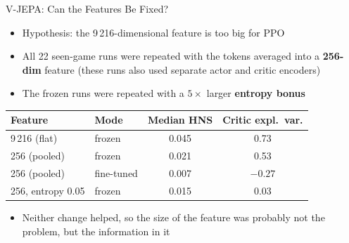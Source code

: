 \documentclass[aspectratio=43,10pt]{beamer}
\begin{document}
\begin{frame}{V-JEPA: Can the Features Be Fixed?}
  \begin{itemize}\setlength\itemsep{0.55em}
    \item Hypothesis: the 9\,216-dimensional feature is too big for PPO
    \item All 22 seen-game runs were repeated with the tokens averaged into a \textbf{256-dim}
          feature (these runs also used separate actor and critic encoders)
    \item The frozen runs were repeated with a $5\times$ larger \textbf{entropy bonus}
  \end{itemize}
  \vspace{0.3em}
  \centering
  {\small
  \begin{tabular}{@{}llcc@{}}
    \toprule
    Feature & Mode & Median HNS & Critic expl.\ var. \\
    \midrule
    9\,216 (flat) & frozen & 0.045 & 0.73 \\
    256 (pooled) & frozen & 0.021 & 0.53 \\
    256 (pooled) & fine-tuned & 0.007 & $-0.27$ \\
    256, entropy 0.05 & frozen & 0.015 & 0.03 \\
    \bottomrule
  \end{tabular}}
  \vspace{0.5em}
  \begin{itemize}\small
    \item Neither change helped, so the size of the feature was probably not the problem, but
          the information in it
  \end{itemize}
\end{frame}
\end{document}
